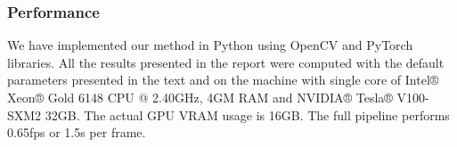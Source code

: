 \documentclass{article}
\begin{document}
\subsubsection{Performance}

We have implemented our method in Python using OpenCV and PyTorch libraries.
All the results presented in the report were computed with the default
parameters presented in the text and on the machine with single core of Intel®
Xeon® Gold 6148 CPU @ 2.40GHz, 4GM RAM and NVIDIA® Tesla® V100-SXM2 32GB. The
actual GPU VRAM usage is 16GB. The full pipeline performs 0.65fps or 1.5s per
frame.



\end{document}
